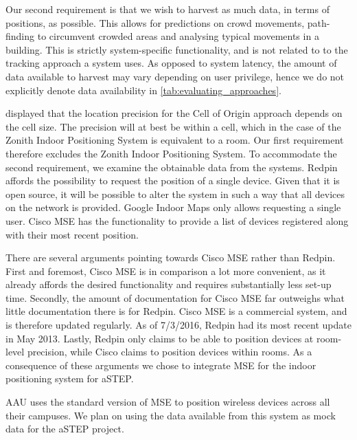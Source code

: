 Our second requirement is that we wish to harvest as much data, in terms of positions, as possible. This allows for predictions on crowd movements, path-finding to circumvent crowded areas and analysing typical movements in a building. This is strictly system-specific functionality, and is not related to to the tracking approach a system uses. As opposed to system latency, the amount of data available to harvest may vary depending on user privilege, hence we do not explicitly denote data availability in \cref{tab:evaluating_approaches}.

 displayed that the location precision for the Cell of Origin approach depends on the cell size. The precision will at best be within a cell, which in the case of the Zonith Indoor Positioning System is equivalent to a room. Our first requirement therefore excludes the Zonith Indoor Positioning System. To accommodate the second requirement, we examine the obtainable data from the systems. Redpin affords the possibility to request the position of a single device. Given that it is open source, it will be possible to alter the system in such a way that all devices on the network is provided. Google Indoor Maps only allows requesting a single user. Cisco MSE has the functionality to provide a list of devices registered along with their most recent position.

There are several arguments pointing towards Cisco MSE rather than Redpin. First and foremost, Cisco MSE is in comparison a lot more convenient, as it already affords the desired functionality and requires substantially less set-up time. Secondly, the amount of documentation for Cisco MSE far outweighs what little documentation there is for Redpin. Cisco MSE is a commercial system, and is therefore updated regularly. As of 7/3/2016, Redpin had its most recent update in May 2013. Lastly, Redpin only claims to be able to position devices at room-level precision, while Cisco claims to position devices within rooms. As a consequence of these arguments we chose to integrate MSE for the indoor positioning system for aSTEP.

AAU uses the standard version of MSE to position wireless devices across all their campuses. We plan on using the data available from this system as mock data for the aSTEP project.